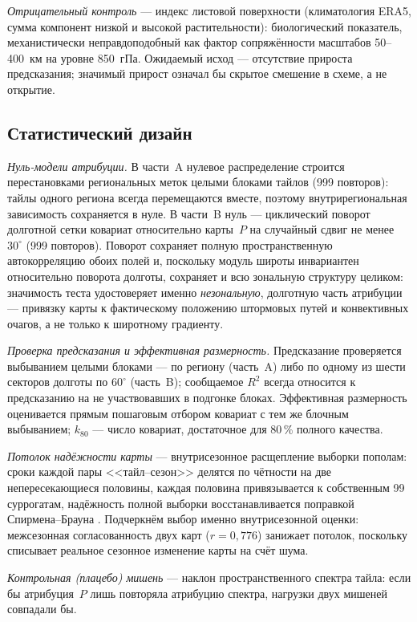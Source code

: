 \documentclass[11pt,a4paper]{article}
\begin{document}
\emph{Отрицательный контроль} --- индекс листовой поверхности (климатология ERA5, сумма компонент низкой и высокой растительности): биологический показатель, механистически неправдоподобный как фактор сопряжённости масштабов 50--400~км на уровне 850~гПа. Ожидаемый исход --- отсутствие прироста предсказания; значимый прирост означал бы скрытое смешение в схеме, а не открытие.

\subsection{Статистический дизайн}

\emph{Нуль-модели атрибуции.} В части~A нулевое распределение строится перестановками региональных меток целыми блоками тайлов (999 повторов): тайлы одного региона всегда перемещаются вместе, поэтому внутрирегиональная зависимость сохраняется в нуле. В части~B нуль --- циклический поворот долготной сетки ковариат относительно карты~$P$ на случайный сдвиг не менее $30^\circ$ (999 повторов). Поворот сохраняет полную пространственную автокорреляцию обоих полей и, поскольку модуль широты инвариантен относительно поворота долготы, сохраняет и всю зональную структуру целиком: значимость теста удостоверяет именно \emph{незональную}, долготную часть атрибуции --- привязку карты к фактическому положению штормовых путей и конвективных очагов, а не только к широтному градиенту.

\emph{Проверка предсказания и эффективная размерность.} Предсказание проверяется выбыванием целыми блоками --- по региону (часть~A) либо по одному из шести секторов долготы по $60^\circ$ (часть~B); сообщаемое $R^2$ всегда относится к предсказанию на не участвовавших в подгонке блоках. Эффективная размерность оценивается прямым пошаговым отбором ковариат с тем же блочным выбыванием; $k_{80}$ --- число ковариат, достаточное для 80\,\% полного качества.

\emph{Потолок надёжности карты} --- внутрисезонное расщепление выборки пополам: сроки каждой пары <<тайл--сезон>> делятся по чётности на две непересекающиеся половины, каждая половина привязывается к собственным 99 суррогатам, надёжность полной выборки восстанавливается поправкой Спирмена--Брауна \cite{Spearman1910,Brown1910}. Подчеркнём выбор именно внутрисезонной оценки: межсезонная согласованность двух карт ($r=0{,}776$) занижает потолок, поскольку списывает реальное сезонное изменение карты на счёт шума.

\emph{Контрольная (плацебо) мишень} --- наклон пространственного спектра тайла: если бы атрибуция~$P$ лишь повторяла атрибуцию спектра, нагрузки двух мишеней совпадали бы.
\end{document}
